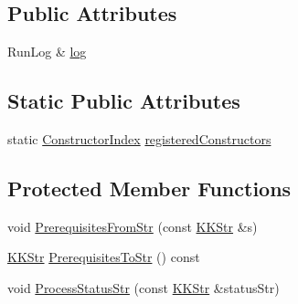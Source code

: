 \subsection*{Public Attributes}
\begin{DoxyCompactItemize}
\item 
Run\+Log \& \hyperlink{class_k_k_job_managment_1_1_k_k_job_ad2466a68d9a01778e0f08af0478b94e5}{log}
\end{DoxyCompactItemize}
\subsection*{Static Public Attributes}
\begin{DoxyCompactItemize}
\item 
static \hyperlink{class_k_k_job_managment_1_1_k_k_job_a95e80219c377acb27706c313c4d41827}{Constructor\+Index} \hyperlink{class_k_k_job_managment_1_1_k_k_job_ad05284b793718e8796f2e11c7aafadc2}{registered\+Constructors}
\end{DoxyCompactItemize}
\subsection*{Protected Member Functions}
\begin{DoxyCompactItemize}
\item 
void \hyperlink{class_k_k_job_managment_1_1_k_k_job_a2be4eba244047011a2d330b7eb46964d}{Prerequisites\+From\+Str} (const \hyperlink{class_k_k_b_1_1_k_k_str}{K\+K\+Str} \&s)
\item 
\hyperlink{class_k_k_b_1_1_k_k_str}{K\+K\+Str} \hyperlink{class_k_k_job_managment_1_1_k_k_job_af7710445d08d9b8898bb239923baa2c6}{Prerequisites\+To\+Str} () const 
\item 
void \hyperlink{class_k_k_job_managment_1_1_k_k_job_a85bebae8e844a701242fabfdc28ad357}{Process\+Status\+Str} (const \hyperlink{class_k_k_b_1_1_k_k_str}{K\+K\+Str} \&status\+Str)
\end{DoxyCompactItemize}
